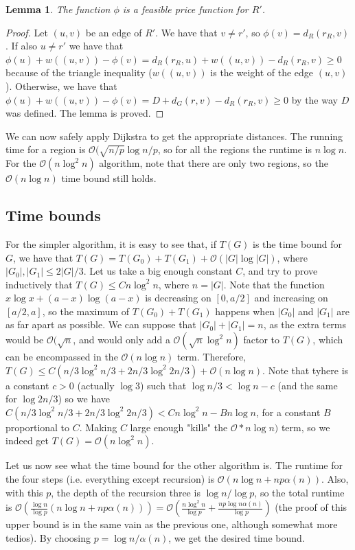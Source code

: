 \documentclass[11pt]{article}
\newtheorem{lemma}[theorem]{Lemma}
\begin{document}
\begin{lemma}
The function $\phi$ is a feasible price function for $R'$.
\end{lemma}

\begin{proof}
Let $(u,v)$ be an edge of $R'$. We have that $v\neq r'$, so $\phi(v) = d_R(r_R,v)$. If also $u\neq r'$ we have that $\phi(u) + w((u,v)) -\phi(v) = d_R(r_R,u) + w((u,v)) - d_R(r_R,v)\geq 0$ because of the triangle inequality ($w((u,v))$ is the weight of the edge $(u,v)$). Otherwise, we have that $\phi(u)+w((u,v))-\phi(v) = D + d_G(r,v) - d_R(r_R,v)\geq 0$ by the way $D$ was defined. The lemma is proved.
\end{proof}

We can now safely apply Dijkstra to get the appropriate distances. The running time for a region is $\mathcal{O}(\sqrt{n/p}\log n/p$, so for all the regions the runtime is $n\log n$. For the $\mathcal{O}(n\log^2 n)$ algorithm, note that there are only two regions, so the $\mathcal{O}(n\log n)$ time bound still holds.

\subsection{Time bounds}

For the simpler algorithm, it is easy to see that, if $T(G)$ is the time bound for $G$, we have that $T(G) = T(G_0) + T(G_1) + \mathcal{O}(|G|\log |G|)$, where $|G_0|, |G_1|\leq 2|G|/3$. Let us take a big enough constant $C$, and try to prove inductively that $T(G)\leq Cn\log^2 n$, where $n=|G|$. Note that the function $x\log x + (a-x)\log (a-x)$ is decreasing on $[0,a/2]$ and increasing on $[a/2,a]$, so the maximum of $T(G_0)+T(G_1)$ happens when $|G_0|$ and $|G_1|$ are as far apart as possible. We can suppose that $|G_0|+|G_1| = n$, as the extra terms would be $\mathcal{O}(\sqrt{n}$, and would only add a $\mathcal{O}(\sqrt{n}\log^2 n)$ factor to $T(G)$, which can be encompassed in the $\mathcal{O}(n\log n)$ term. Therefore, $T(G)\leq C(n/3\log^2 n/3 + 2n/3\log^2 2n/3) + \mathcal{O}(n\log n)$. Note that tyhere is a constant $c>0$ (actually $\log 3$) such that $\log n/3 < \log n - c$ (and the same for $\log 2n/3$) so we have $C(n/3\log^2 n/3 + 2n/3\log^2 2n/3) < Cn\log^2 n - Bn\log n$, for a constant $B$ proportional to $C$. Making $C$ large enough "kills" the $\mathcal{O}*n\log n)$ term, so we indeed get $T(G) = \mathcal{O}(n\log^2 n)$.

Let us now see what the time bound for the other algorithm is. The runtime for the four steps (i.e. everything except recursion) is $\mathcal{O}(n\log n + np\alpha(n))$. Also, with this $p$, the depth of the recursion three is $\log n/\log p$, so the total runtime is $\mathcal{O}(\frac{\log n}{\log p}(n\log n+ np\alpha(n))) = \mathcal{O}(\frac{n\log^2 n}{\log p} + \frac{np\log n\alpha(n)}{\log p})$ (the proof of this upper bound is in the same vain as the previous one, although somewhat more tedios). By choosing $p = \log n/\alpha(n)$, we get the desired time bound.
\end{document}
